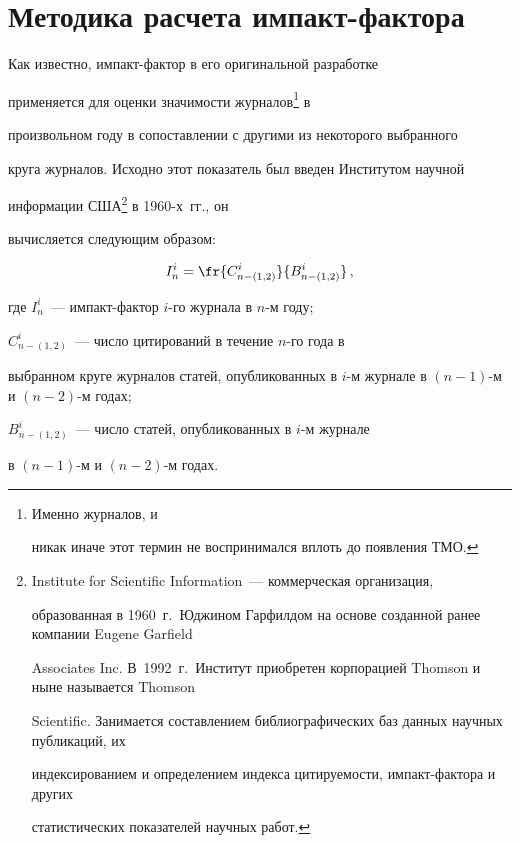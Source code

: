 \section{Методика расчета импакт-фактора}





    Как известно, импакт-фактор в его оригинальной разработке 


применяется для оценки значимости журналов\footnote[2]{Именно журналов, и 


никак иначе этот термин не воспринимался вплоть до появления ТМО.} в 


произвольном году в сопоставлении с другими из некоторого выбранного 


круга журналов. Исходно этот показатель был введен Институтом научной 


информации США\footnote[3]{Institute for Scientific Information~--- коммерческая организация, 


образованная в 1960~г.\ Юджином Гарфилдом на основе созданной ранее компании Eugene Garfield 


Associates Inc. В~1992~г.\ Институт приобретен корпорацией Thomson и ныне называется Thomson 


Scientific.  Занимается составлением библиографических баз данных научных публикаций, их 


индексированием и определением индекса цитируемости, импакт-фактора и других 


статистических показателей научных работ.} в 1960-х~гг., он 


вычисляется следующим образом:


    \begin{equation}


    I_n^i=\fr{C_{n-(1,2)}^i}{B^i_{n-(1,2)}}\,,


    \label{1-2-14}


    \end{equation}


    где $I_n^i$~--- импакт-фактор $i$-го журнала в $n$-м году;


$ C_{n-(1,2)}^i$~--- чис\-ло цитирований в течение $n$-го года в 


выбранном круге журналов статей, опубликованных в $i$-м журнале в $(n-1)$-м и $(n-2)$-м годах; 


$B^i_{n-(1,2)}$~--- число статей, опубликованных в $i$-м журнале 


в $(n-1)$-м и $(n-2)$-м годах.


